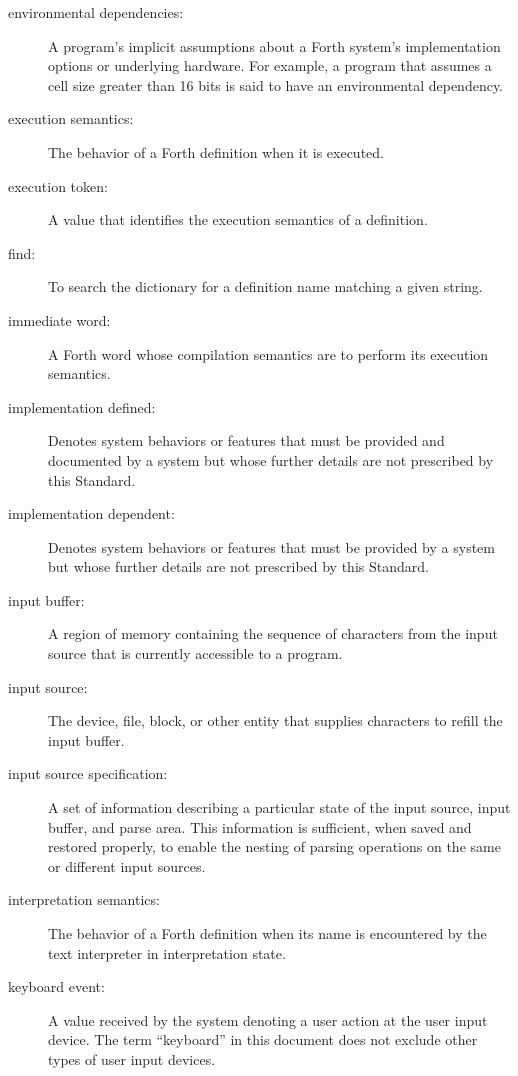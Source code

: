 \begin{description}
\item[environmental dependencies:]
	A program's implicit assumptions about a Forth system's
	implementation options or underlying hardware. For example,
	a program that assumes a cell size greater than 16 bits is
	said to have an environmental dependency.

\item[execution semantics:]
	The behavior of a Forth definition when it is executed.

\item[execution token:]
	A value that identifies the execution semantics of a definition.

\item[find:]
	To search the dictionary for a definition name matching a given
	string.

\item[immediate word:]
	A Forth word whose compilation semantics are to perform its
	execution semantics.

\item[implementation defined:]
	Denotes system behaviors or features that must be provided and
	documented by a system but whose further details are not prescribed
	by this Standard.

\item[implementation dependent:]
	Denotes system behaviors or features that must be provided by a
	system but whose further details are not prescribed by this Standard.

\item[input buffer:]
	A region of memory containing the sequence of characters from the
	input source that is currently accessible to a program.

\item[input source:]
	The device, file, block, or other entity that supplies characters
	to refill the input buffer.

\item[input source specification:]
	A set of information describing a particular state of the input
	source, input buffer, and parse area. This information is
	sufficient, when saved and restored properly, to enable the nesting
	of parsing operations on the same or different input sources.

\item[interpretation semantics:]
	The behavior of a Forth definition when its name is encountered
	by the text interpreter in interpretation state.

\item[keyboard event:]
	A value received by the system denoting a user action at the user
	input device. The term ``keyboard'' in this document does not
	exclude other types of user input devices.


\end{description}
